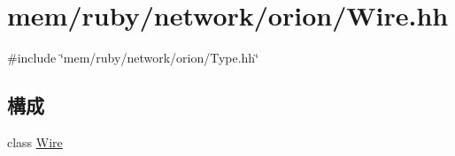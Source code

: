 \hypertarget{Wire_8hh}{
\section{mem/ruby/network/orion/Wire.hh}
\label{Wire_8hh}
}
{\ttfamily \#include \char`\"{}mem/ruby/network/orion/Type.hh\char`\"{}}\par
\subsection*{構成}
\begin{DoxyCompactItemize}
\item 
class \hyperlink{classWire}{Wire}
\end{DoxyCompactItemize}
